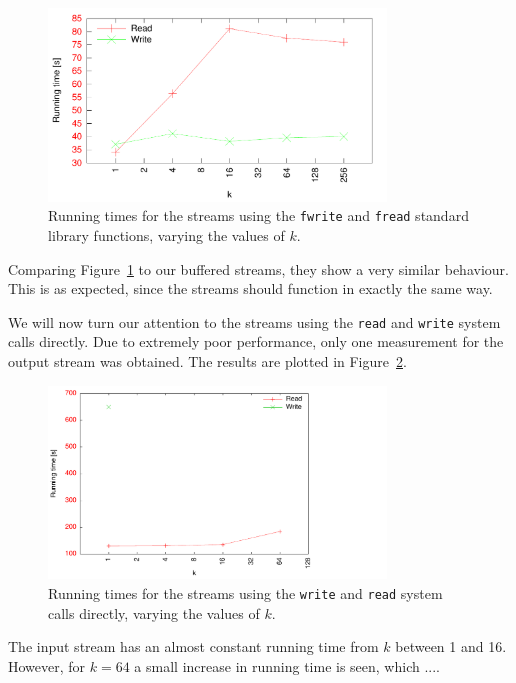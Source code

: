 \documentclass[a4paper,12pt]{article}
\begin{document}
\begin{figure}[h!]
  \centering
  \includegraphics[width=0.8\textwidth]{fstreams}
  \caption{Running times for the streams using the \texttt{fwrite} and
    \texttt{fread} standard library functions, varying the values of
    $k$.}
  \label{fig:fstreams}
\end{figure}

Comparing Figure~\ref{fig:fstreams} to our buffered streams, they show
a very similar behaviour. This is as expected, since the streams
should function in exactly the same way.

We will now turn our attention to the streams using the \texttt{read}
and \texttt{write} system calls directly. Due to extremely poor
performance, only one measurement for the output stream was
obtained. The results are plotted in Figure~\ref{fig:syscall-streams}.

\begin{figure}[h!]
  \centering
  \includegraphics[width=0.8\textwidth]{syscall_streams}
  \caption{Running times for the streams using the \texttt{write} and
    \texttt{read} system calls directly, varying the values of $k$.}
  \label{fig:syscall-streams}
\end{figure}

The input stream has an almost constant running time from $k$ between
1 and 16. However, for $k = 64$ a small increase in running time is
seen, which ....
\end{document}
